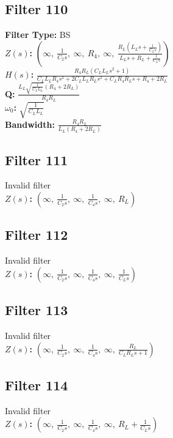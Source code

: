 \documentclass{article}
\begin{document}
\subsection*{Filter 110}
\textbf{Filter Type:} BS \\ 
\textbf{$Z(s)$:} $\left( \infty, \  \frac{1}{C_{2} s}, \  \infty, \  R_{4}, \  \infty, \  \frac{R_{L} \left(L_{L} s + \frac{1}{C_{L} s}\right)}{L_{L} s + R_{L} + \frac{1}{C_{L} s}}\right)$ \\ 
\textbf{$H(s)$:} $\frac{R_{4} R_{L} \left(C_{L} L_{L} s^{2} + 1\right)}{C_{L} L_{L} R_{4} s^{2} + 2 C_{L} L_{L} R_{L} s^{2} + C_{L} R_{4} R_{L} s + R_{4} + 2 R_{L}}$ \\ 
\textbf{Q:} $\frac{L_{L} \sqrt{\frac{1}{C_{L} L_{L}}} \left(R_{4} + 2 R_{L}\right)}{R_{4} R_{L}}$ \\ 
\textbf{$\omega_0$:} $\sqrt{\frac{1}{C_{L} L_{L}}}$ \\ 
\textbf{Bandwidth:} $\frac{R_{4} R_{L}}{L_{L} \left(R_{4} + 2 R_{L}\right)}$ \\ 
\subsection*{Filter 111}
Invalid filter \\ 
\textbf{$Z(s)$:} $\left( \infty, \  \frac{1}{C_{2} s}, \  \infty, \  \frac{1}{C_{4} s}, \  \infty, \  R_{L}\right)$ \\ 
\subsection*{Filter 112}
Invalid filter \\ 
\textbf{$Z(s)$:} $\left( \infty, \  \frac{1}{C_{2} s}, \  \infty, \  \frac{1}{C_{4} s}, \  \infty, \  \frac{1}{C_{L} s}\right)$ \\ 
\subsection*{Filter 113}
Invalid filter \\ 
\textbf{$Z(s)$:} $\left( \infty, \  \frac{1}{C_{2} s}, \  \infty, \  \frac{1}{C_{4} s}, \  \infty, \  \frac{R_{L}}{C_{L} R_{L} s + 1}\right)$ \\ 
\subsection*{Filter 114}
Invalid filter \\ 
\textbf{$Z(s)$:} $\left( \infty, \  \frac{1}{C_{2} s}, \  \infty, \  \frac{1}{C_{4} s}, \  \infty, \  R_{L} + \frac{1}{C_{L} s}\right)$ \\ 
\end{document}

